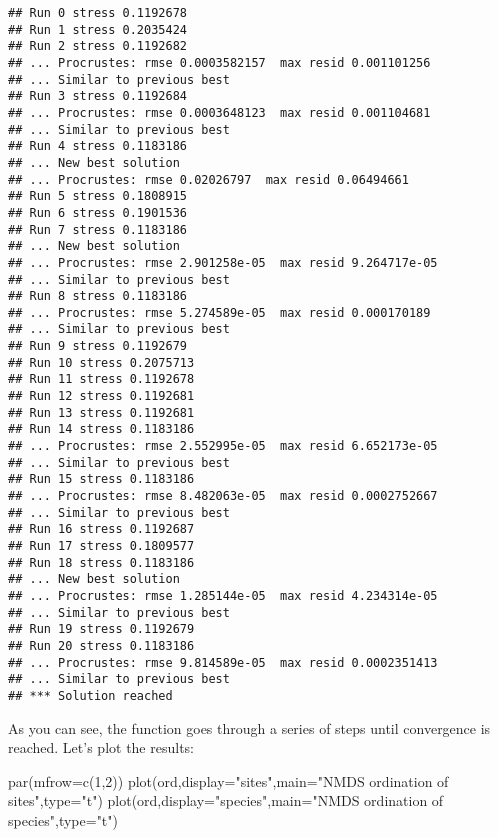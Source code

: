 \documentclass[
]{book}
\newenvironment{Shaded}{\begin{snugshade}}{\end{snugshade}}
\newcommand{\AttributeTok}[1]{\textcolor[rgb]{0.77,0.63,0.00}{#1}}
\newcommand{\DecValTok}[1]{\textcolor[rgb]{0.00,0.00,0.81}{#1}}
\newcommand{\FunctionTok}[1]{\textcolor[rgb]{0.00,0.00,0.00}{#1}}
\newcommand{\NormalTok}[1]{#1}
\newcommand{\StringTok}[1]{\textcolor[rgb]{0.31,0.60,0.02}{#1}}
\begin{document}
\begin{verbatim}
## Run 0 stress 0.1192678 
## Run 1 stress 0.2035424 
## Run 2 stress 0.1192682 
## ... Procrustes: rmse 0.0003582157  max resid 0.001101256 
## ... Similar to previous best
## Run 3 stress 0.1192684 
## ... Procrustes: rmse 0.0003648123  max resid 0.001104681 
## ... Similar to previous best
## Run 4 stress 0.1183186 
## ... New best solution
## ... Procrustes: rmse 0.02026797  max resid 0.06494661 
## Run 5 stress 0.1808915 
## Run 6 stress 0.1901536 
## Run 7 stress 0.1183186 
## ... New best solution
## ... Procrustes: rmse 2.901258e-05  max resid 9.264717e-05 
## ... Similar to previous best
## Run 8 stress 0.1183186 
## ... Procrustes: rmse 5.274589e-05  max resid 0.000170189 
## ... Similar to previous best
## Run 9 stress 0.1192679 
## Run 10 stress 0.2075713 
## Run 11 stress 0.1192678 
## Run 12 stress 0.1192681 
## Run 13 stress 0.1192681 
## Run 14 stress 0.1183186 
## ... Procrustes: rmse 2.552995e-05  max resid 6.652173e-05 
## ... Similar to previous best
## Run 15 stress 0.1183186 
## ... Procrustes: rmse 8.482063e-05  max resid 0.0002752667 
## ... Similar to previous best
## Run 16 stress 0.1192687 
## Run 17 stress 0.1809577 
## Run 18 stress 0.1183186 
## ... New best solution
## ... Procrustes: rmse 1.285144e-05  max resid 4.234314e-05 
## ... Similar to previous best
## Run 19 stress 0.1192679 
## Run 20 stress 0.1183186 
## ... Procrustes: rmse 9.814589e-05  max resid 0.0002351413 
## ... Similar to previous best
## *** Solution reached
\end{verbatim}

As you can see, the function goes through a series of steps until convergence is reached. Let's plot the results:

\begin{Shaded}
\begin{Highlighting}[]
\FunctionTok{par}\NormalTok{(}\AttributeTok{mfrow=}\FunctionTok{c}\NormalTok{(}\DecValTok{1}\NormalTok{,}\DecValTok{2}\NormalTok{))}
\FunctionTok{plot}\NormalTok{(ord,}\AttributeTok{display=}\StringTok{"sites"}\NormalTok{,}\AttributeTok{main=}\StringTok{"NMDS ordination of sites"}\NormalTok{,}\AttributeTok{type=}\StringTok{"t"}\NormalTok{)}
\FunctionTok{plot}\NormalTok{(ord,}\AttributeTok{display=}\StringTok{"species"}\NormalTok{,}\AttributeTok{main=}\StringTok{"NMDS ordination of species"}\NormalTok{,}\AttributeTok{type=}\StringTok{"t"}\NormalTok{)}
\end{Highlighting}
\end{Shaded}
\end{document}
